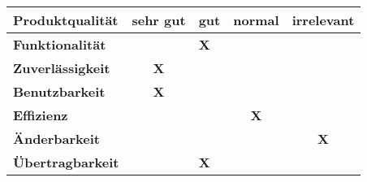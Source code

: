 \begin{table}[H]
	\begin{center}
		\begin{tabularx}{\linewidth}{|X|c|x|c|c|}
			\hline
			\textbf{Produktqualität} & \textbf{sehr gut} & \textbf{gut} & \textbf{normal} & \textbf{irrelevant}\\
			\hline
			\textbf{Funktionalität} & &\textbf{X} & &\\
			\hline
			\textbf{Zuverlässigkeit} & \textbf{X}& & &\\
			\hline
			\textbf{Benutzbarkeit} &\textbf{X} & & &\\
			\hline
			\textbf{Effizienz} & & & \textbf{X} &\\
			\hline
			\textbf{Änderbarkeit} & & & &\textbf{X}\\
			\hline
			\textbf{Übertragbarkeit} & & \textbf{X} &  &\\
			\hline
		\end{tabularx}
	\end{center}
\end{table}